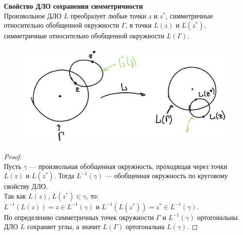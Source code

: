 \textbf{Свойство ДЛО сохранения симметричности}\\
Произвольное ДЛО $L$ преобразует любые точки $z$ и $z^*$, симметричные относительно обобщенной окружности $\Gamma$, в точки $L(z)$ и $L(z^*)$, симметричные относительно обобщенной окружности $L(\Gamma)$.

\begin{figure}[!ht]
    \begin{center}
    \includegraphics[scale=0.4]{answers/img/ans8.png}
    \label{pic08}
    \end{center}
\end{figure}

\begin{proof}
    \ \\
    Пусть $\gamma$ --- произвольная обобщенная окружность, проходящая через точки $L(z)$ и $L(z^*)$. Тогда $L^{-1}(\gamma)$ --- обобщенная окружность по круговому свойству ДЛО.\\[2mm]
    Так как $L(z)$, $L(z^*) \in \gamma$, то:\\
    $L^{-1}(L(z))=z \in L^{-1}(\gamma)$ и $L^{-1}(L(z^*))=z^*\in L^{-1}(\gamma)$.\\[2mm]
    По определению симметричных точек окружности $\Gamma$ и $L^{-1}(\gamma)$ ортогональны. ДЛО $L$ сохраняет углы, а значит $L(\Gamma)$ ортогональна $L(\gamma)$. 
\end{proof}
